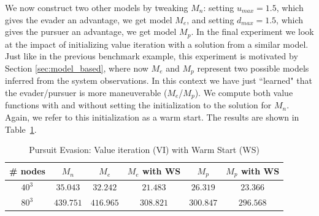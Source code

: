 We now construct two other models by tweaking $M_n$: setting $u_{max}=1.5$, which gives the evader an advantage, we get model $M_e$, and setting $d_{max}=1.5$, which gives the pursuer an advantage,  we get model $M_p$. In the final experiment we look at the impact of initializing value iteration with a solution from a similar model. Just like in the previous benchmark example, this experiment is motivated by Section \ref{sec:model_based}, where now $M_e$ and $M_p$ represent two possible models inferred from the system observations. In this context we have just ``learned" that the evader/pursuer is more maneuverable ($M_e$/$M_p$). We compute both value functions with and without setting the initialization to the solution for $M_n$. Again, we refer to this initialization as a warm start. The results are shown in Table~\ref{tab:ws_pe}.

\begin{table}
\centering
\caption{Pursuit Evasion: Value iteration (VI) with Warm Start (WS)}
\begin{tabular}{|c| c| c| c| c| c|}
\hline
\# nodes & $M_n$ & $M_e$ &  $M_e$ with WS & $M_p$ & $M_p$ with WS \\ \hline
$40^3$ & $35.043$ & $32.242$ & $21.483$ & $26.319$ & $23.366$ \\ \hline
$80^3$ & $439.751$ & $416.965$ & $308.821$ & $300.847$ & $296.568$\\ \hline
\end{tabular}
\label{tab:ws_pe}
\end{table}
